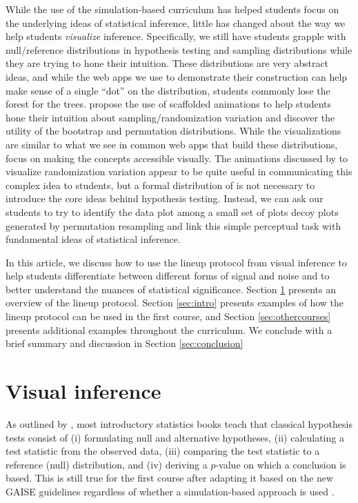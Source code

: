 \documentclass[12pt]{article}
\begin{document}
While the use of the simulation-based curriculum has helped students
focus on the underlying ideas of statistical inference, little has
changed about the way we help students \emph{visualize} inference.
Specifically, we still have students grapple with null/reference
distributions in hypothesis testing and sampling distributions while
they are trying to hone their intuition. These distributions are very
abstract ideas, and while the web apps we use to demonstrate their
construction can help make sense of a single ``dot'' on the
distribution, students commonly lose the forest for the trees.
\citet{wild2017} propose the use of scaffolded animations to help
students hone their intuition about sampling/randomization variation and
discover the utility of the bootstrap and permutation distributions.
While the visualizations are similar to what we see in common web apps
that build these distributions, \citet{wild2017} focus on making the
concepts accessible visually. The animations discussed by
\citet{wild2017} to visualize randomization variation appear to be quite
useful in communicating this complex idea to students, but a formal
distribution of is not necessary to introduce the core ideas behind
hypothesis testing. Instead, we can ask our students to try to identify
the data plot among a small set of plots decoy plots generated by
permutation resampling and link this simple perceptual task with
fundamental ideas of statistical inference.

In this article, we discuss how to use the lineup protocol from visual
inference to help students differentiate between different forms of
signal and noise and to better understand the nuances of statistical
significance. Section \ref{sec:vizinf} presents an overview of the
lineup protocol. Section \ref{sec:intro} presents examples of how the
lineup protocol can be used in the first course, and Section
\ref{sec:othercourses} presents additional examples throughout the
curriculum. We conclude with a brief summary and discussion in Section
\ref{sec:conclusion}

\section{Visual inference}
\label{sec:vizinf}

As outlined by \citet{Cobb-2007uo}, most introductory statistics books
teach that classical hypothesis tests consist of (i) formulating null
and alternative hypotheses, (ii) calculating a test statistic from the
observed data, (iii) comparing the test statistic to a reference (null)
distribution, and (iv) deriving a \(p\)-value on which a conclusion is
based. This is still true for the first course after adapting it based
on the new GAISE guidelines regardless of whether a simulation-based
approach is used \citep[cf.~][]{Lock2017, tintle2015, introstats}.
\end{document}
